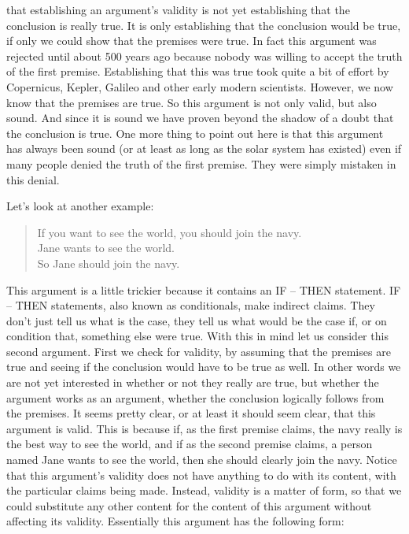\documentclass[justified]{tufte-book}
\newenvironment{argument}{\begin{quote}\normalsize}{\end{quote}}
\begin{document}
 that establishing an argument's validity is not yet establishing that the conclusion is really true. It is only establishing that the conclusion would be true, if only we could show that the premises were true. In fact this argument was rejected until about 500 years ago because nobody was willing to accept the truth of the first premise. Establishing that this was true took quite a bit of effort by Copernicus, Kepler, Galileo and other early modern scientists. However, we now know that the premises are true. So this argument is not only valid, but also sound. And since it is sound we have proven beyond the shadow of a doubt that the conclusion is true. One more thing to point out here is that this argument has always been sound (or at least as long as the solar system has existed) even if many people denied the truth of the first premise. They were simply mistaken in this denial.

Let's look at another example:

\begin{argument}
If you want to see the world, you should join the navy.\\
Jane wants to see the world.\\

So Jane should join the navy.
\end{argument}

This argument is a little trickier because it contains an IF -- THEN statement. IF -- THEN statements, also known as conditionals, make indirect claims. They don't just tell us what is the case, they tell us what would be the case if, or on condition that, something else were true. With this in mind let us consider this second argument. First we check for validity, by assuming that the premises are true and seeing if the conclusion would have to be true as well. In other words we are not yet interested in whether or not they really are true, but whether the argument works as an argument, whether the conclusion logically follows from the premises. It seems pretty clear, or at least it should seem clear, that this argument is valid. This is because if, as the first premise claims, the navy really is the best way to see the world, and if as the second premise claims, a person named Jane wants to see the world, then she should clearly join the navy. Notice that this argument's validity does not have anything to do with its content, with the particular claims being made. Instead, validity is a matter of form, so that we could substitute any other content for the content of this argument without affecting its validity. Essentially this argument has the following form:
\end{document}
